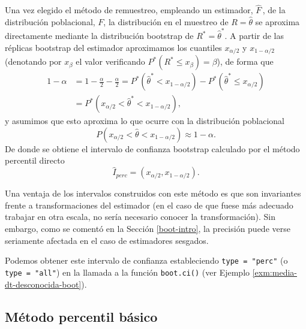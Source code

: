 \documentclass[
]{book}
\theoremstyle{break}
\theoremstyle{nonumberplain}
\begin{document}
Una vez elegido el método de remuestreo, empleando un estimador, \(\hat{F}\,\), de la
distribución poblacional, \(F\), la distribución en el muestreo de \(R = \hat{\theta}\) se aproxima directamente mediante la distribución bootstrap de \(R^{\ast}= \hat{\theta}^{\ast}\).
A partir de las réplicas bootstrap del estimador aproximamos los cuantiles \(x_{\alpha /2}\) y \(x_{1-\alpha /2}\) (denotando por \(x_{\beta }\) el valor verificando \(P^{\ast}\left( R^{\ast }\leq x_{\beta } \right) =\beta\)), de forma que
\[\begin{aligned}
1-\alpha &= 1-\frac{\alpha }{2}-\frac{\alpha }{2}
= P^{\ast}\left( \hat{\theta}^{\ast}<x_{1-\alpha /2} \right) - P^{\ast}\left( \hat{\theta}^{\ast}\leq x_{\alpha /2} \right) \\
&= P^{\ast}\left( x_{\alpha /2}<\hat{\theta}^{\ast}<x_{1-\alpha /2} \right),
\end{aligned}\]
y asumimos que esto aproxima lo que ocurre con la distribución poblacional
\[P\left( x_{\alpha /2} < \hat{\theta} < x_{1-\alpha /2} \right) \approx 1-\alpha.\]
De donde se obtiene el intervalo de confianza bootstrap calculado
por el método percentil directo
\[\hat{I}_{perc}=\left( x_{\alpha /2}, x_{1-\alpha /2}  \right).\]

Una ventaja de los intervalos construidos con este método es que son invariantes frente a transformaciones del estimador (en el caso de que fuese más adecuado trabajar en otra escala, no sería necesario conocer la transformación).
Sin embargo, como se comentó en la Sección \ref{boot-intro}, la precisión puede verse seriamente afectada en el caso de estimadores sesgados.

Podemos obtener este intervalo de confianza estableciendo \texttt{type\ =\ "perc"} (o \texttt{type\ =\ "all"}) en la llamada a la función \texttt{boot.ci()} (ver Ejemplo \ref{exm:media-dt-desconocida-boot}).

\hypertarget{boot-ic-basic}{%
\subsection{Método percentil básico}\label{boot-ic-basic}}
\end{document}
